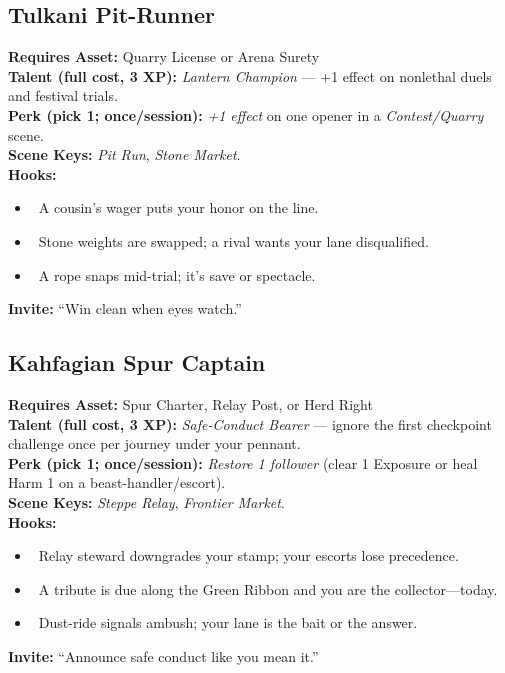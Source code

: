\documentclass[11pt]{article}
\begin{document}
\subsection*{Tulkani Pit-Runner}
\textbf{Requires Asset:} Quarry License or Arena Surety\\
\textbf{Talent (full cost, 3 XP):} \emph{Lantern Champion} — +1 effect on nonlethal duels and festival trials.\\
\textbf{Perk (pick 1; once/session):} \emph{+1 effect} on one opener in a \emph{Contest/Quarry} scene.\\
\textbf{Scene Keys:} \emph{Pit Run}, \emph{Stone Market}.\\[2pt]
\textbf{Hooks:}
\begin{itemize}
  \item \heartsuit~A cousin’s wager puts your honor on the line.
  \item \diamondsuit~Stone weights are swapped; a rival wants your lane disqualified.
  \item \spadesuit~A rope snaps mid-trial; it’s save or spectacle.
\end{itemize}
\textbf{Invite:} “Win clean when eyes watch.”

\subsection*{Kahfagian Spur Captain}
\textbf{Requires Asset:} Spur Charter, Relay Post, or Herd Right\\
\textbf{Talent (full cost, 3 XP):} \emph{Safe-Conduct Bearer} — ignore the first checkpoint challenge once per journey under your pennant.\\
\textbf{Perk (pick 1; once/session):} \emph{Restore 1 follower} (clear 1 Exposure or heal Harm 1 on a beast-handler/escort).\\
\textbf{Scene Keys:} \emph{Steppe Relay}, \emph{Frontier Market}.\\[2pt]
\textbf{Hooks:}
\begin{itemize}
  \item \clubsuit~Relay steward downgrades your stamp; your escorts lose precedence.
  \item \diamondsuit~A tribute is due along the Green Ribbon and you are the collector—today.
  \item \spadesuit~Dust-ride signals ambush; your lane is the bait or the answer.
\end{itemize}
\textbf{Invite:} “Announce safe conduct like you mean it.”
\end{document}
